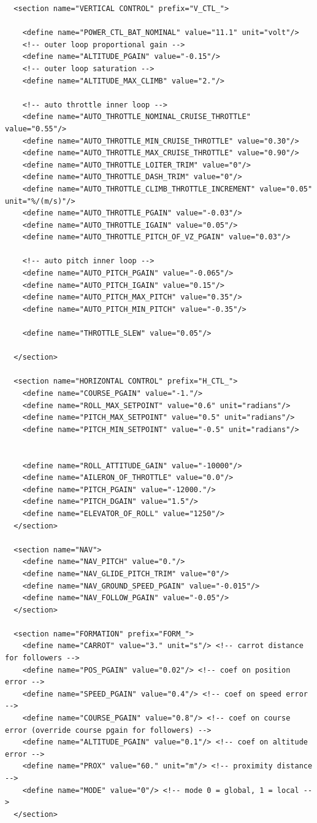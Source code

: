 \documentclass[a4paper,11pt]{report}
\begin{document}
\begin{lstlisting}
  <section name="VERTICAL CONTROL" prefix="V_CTL_">

    <define name="POWER_CTL_BAT_NOMINAL" value="11.1" unit="volt"/>
    <!-- outer loop proportional gain -->
    <define name="ALTITUDE_PGAIN" value="-0.15"/>
    <!-- outer loop saturation -->
    <define name="ALTITUDE_MAX_CLIMB" value="2."/>

    <!-- auto throttle inner loop -->
    <define name="AUTO_THROTTLE_NOMINAL_CRUISE_THROTTLE" value="0.55"/>
    <define name="AUTO_THROTTLE_MIN_CRUISE_THROTTLE" value="0.30"/>
    <define name="AUTO_THROTTLE_MAX_CRUISE_THROTTLE" value="0.90"/>
    <define name="AUTO_THROTTLE_LOITER_TRIM" value="0"/>
    <define name="AUTO_THROTTLE_DASH_TRIM" value="0"/>
    <define name="AUTO_THROTTLE_CLIMB_THROTTLE_INCREMENT" value="0.05" unit="%/(m/s)"/>
    <define name="AUTO_THROTTLE_PGAIN" value="-0.03"/>
    <define name="AUTO_THROTTLE_IGAIN" value="0.05"/>
    <define name="AUTO_THROTTLE_PITCH_OF_VZ_PGAIN" value="0.03"/>
    
    <!-- auto pitch inner loop -->
    <define name="AUTO_PITCH_PGAIN" value="-0.065"/>
    <define name="AUTO_PITCH_IGAIN" value="0.15"/>
    <define name="AUTO_PITCH_MAX_PITCH" value="0.35"/>
    <define name="AUTO_PITCH_MIN_PITCH" value="-0.35"/>

    <define name="THROTTLE_SLEW" value="0.05"/>

  </section>

  <section name="HORIZONTAL CONTROL" prefix="H_CTL_">
    <define name="COURSE_PGAIN" value="-1."/>
    <define name="ROLL_MAX_SETPOINT" value="0.6" unit="radians"/>
    <define name="PITCH_MAX_SETPOINT" value="0.5" unit="radians"/>
    <define name="PITCH_MIN_SETPOINT" value="-0.5" unit="radians"/>


    <define name="ROLL_ATTITUDE_GAIN" value="-10000"/>
    <define name="AILERON_OF_THROTTLE" value="0.0"/>
    <define name="PITCH_PGAIN" value="-12000."/>
    <define name="PITCH_DGAIN" value="1.5"/>
    <define name="ELEVATOR_OF_ROLL" value="1250"/>
  </section>

  <section name="NAV">
    <define name="NAV_PITCH" value="0."/>
    <define name="NAV_GLIDE_PITCH_TRIM" value="0"/>
    <define name="NAV_GROUND_SPEED_PGAIN" value="-0.015"/>
    <define name="NAV_FOLLOW_PGAIN" value="-0.05"/>
  </section>

  <section name="FORMATION" prefix="FORM_">
    <define name="CARROT" value="3." unit="s"/> <!-- carrot distance for followers -->
    <define name="POS_PGAIN" value="0.02"/> <!-- coef on position error -->
    <define name="SPEED_PGAIN" value="0.4"/> <!-- coef on speed error -->
    <define name="COURSE_PGAIN" value="0.8"/> <!-- coef on course error (override course pgain for followers) -->
    <define name="ALTITUDE_PGAIN" value="0.1"/> <!-- coef on altitude error -->
    <define name="PROX" value="60." unit="m"/> <!-- proximity distance -->
    <define name="MODE" value="0"/> <!-- mode 0 = global, 1 = local -->
  </section>


\end{lstlisting}
\end{document}
